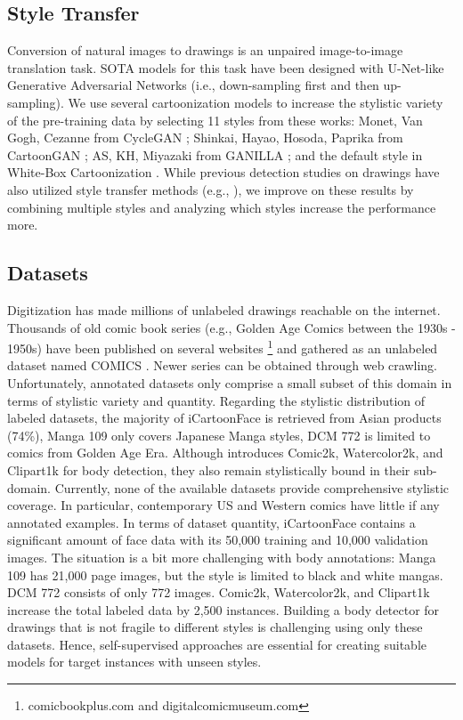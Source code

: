 \documentclass{article}
\begin{document}
\subsection{Style Transfer}
\label{subsection:style_trans}

 Conversion of natural images to drawings is an unpaired image-to-image translation task. SOTA models for this task have been designed with U-Net-like Generative Adversarial Networks (i.e., down-sampling first and then up-sampling). We use several cartoonization models to increase the stylistic variety of the pre-training data by selecting 11 styles from these works: Monet, Van Gogh, Cezanne from CycleGAN \cite{CycleGAN2017}; Shinkai, Hayao, Hosoda, Paprika from CartoonGAN \cite{chen2018cartoongan}; AS, KH, Miyazaki from GANILLA \cite{DBLP:journals/corr/abs-2002-05638}; and the default style in White-Box Cartoonization \cite{Wang_2020_CVPR}. While previous detection studies on drawings have also utilized style transfer methods (e.g., \cite{inoue2018crossdomain,umt_model}), we improve on these results by combining multiple styles and analyzing which styles increase the performance more.

\subsection{Datasets}
\label{subsection:datasets}

Digitization has made millions of unlabeled drawings reachable on the internet. Thousands of old comic book series (e.g., Golden Age Comics between the 1930s - 1950s) have been published on several websites \footnote{comicbookplus.com and digitalcomicmuseum.com} and gathered as an unlabeled dataset named COMICS \cite{iyyer2017amazing}. Newer series can be obtained through web crawling. Unfortunately, annotated datasets only comprise a small subset of this domain in terms of stylistic variety and quantity. Regarding the stylistic distribution of labeled datasets, the majority of iCartoonFace \cite{zheng2020cartoon} is retrieved from Asian products (74\%), Manga 109 \cite{mtap_matsui_2017} only covers Japanese Manga styles, DCM 772 \cite{jimaging4070089} is limited to comics from Golden Age Era. Although \cite{inoue2018crossdomain} introduces Comic2k, Watercolor2k, and Clipart1k for body detection, they also remain stylistically bound in their sub-domain. Currently, none of the available datasets provide comprehensive stylistic coverage. In particular, contemporary US and Western comics have little if any annotated examples. In terms of dataset quantity, iCartoonFace contains a significant amount of face data with its 50,000 training and 10,000 validation images. The situation is a bit more challenging with body annotations: Manga 109 has 21,000 page images, but the style is limited to black and white mangas. DCM 772 consists of only 772 images. Comic2k, Watercolor2k, and Clipart1k increase the total labeled data by 2,500 instances. Building a body detector for drawings that is not fragile to different styles is challenging using only these datasets. Hence, self-supervised approaches are essential for creating suitable models for target instances with unseen styles.
\end{document}
